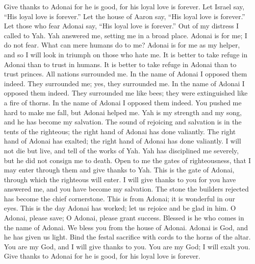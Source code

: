 \begin{biblechapter} %
 Give thanks to Adonai for he is good, 
for his loyal love is forever.
\verse Let Israel say, 
“His loyal love is forever.”
\verse Let the house of Aaron say, 
“His loyal love is forever.”
\verse Let those who fear Adonai say, 
“His loyal love is forever.”
\verse Out of my distress I called to Yah. 
Yah answered me, setting me in a broad place.
\verse Adonai is for me; I do not fear. 
What can mere humans do to me?
\verse Adonai is for me as my helper, 
and so I will look in triumph on those who hate me.
\verse It is better to take refuge in Adonai 
than to trust in humans.
\verse It is better to take refuge in Adonai 
than to trust princes.
\verse All nations surrounded me. 
In the name of Adonai I opposed them indeed.
\verse They surrounded me; yes, they surrounded me. 
In the name of Adonai I opposed them indeed.
\verse They surrounded me like bees; 
they were extinguished like a fire of thorns. 
In the name of Adonai I opposed them indeed.
\verse You pushed me hard to make me fall, 
but Adonai helped me.
\verse Yah is my strength and my song, 
and he has become my salvation.
\verse The sound of rejoicing and salvation 
is in the tents of the righteous; 
the right hand of Adonai has done valiantly.
\verse The right hand of Adonai has exalted; 
the right hand of Adonai has done valiantly.
\verse I will not die but live, 
and tell of the works of Yah.
\verse Yah has disciplined me severely, 
but he did not consign me to death.
\verse Open to me the gates of righteousness, 
that I may enter through them 
and give thanks to Yah.
\verse This is the gate of Adonai, 
through which the righteous will enter.
\verse I will give thanks to you for you have answered me, 
and you have become my salvation.
\verse The stone the builders rejected 
has become the chief cornerstone.
\verse This is from Adonai; 
it is wonderful in our eyes.
\verse This is the day Adonai has worked; 
let us rejoice and be glad in him.
\verse O Adonai, please save; 
O Adonai, please grant success.
\verse Blessed is he who comes in the name of Adonai. 
We bless you from the house of Adonai.
\verse Adonai is God, and he has given us light. 
Bind the festal sacrifice with cords 
to the horns of the altar.
\verse You are my God, and I will give thanks to you. 
You are my God; I will exalt you.
\verse Give thanks to Adonai for he is good, 
for his loyal love is forever.
\end{biblechapter}

